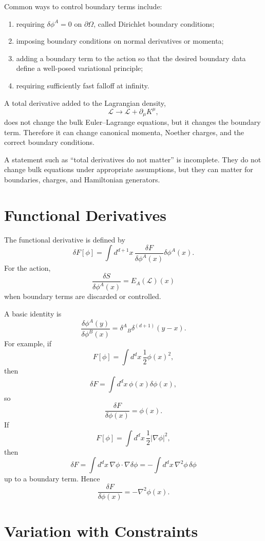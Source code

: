 Common ways to control boundary terms include:
\begin{enumerate}
    \item requiring \(\delta\phi^A=0\) on \(\partial\Omega\), called Dirichlet
    boundary conditions;
    \item imposing boundary conditions on normal derivatives or momenta;
    \item adding a boundary term to the action so that the desired boundary data
    define a well-posed variational principle;
    \item requiring sufficiently fast falloff at infinity.
\end{enumerate}

A total derivative added to the Lagrangian density,
\[
    \mathcal{L}\longrightarrow \mathcal{L}+\partial_\mu K^\mu,
\]
does not change the bulk Euler--Lagrange equations, but it changes the boundary
term. Therefore it can change canonical momenta, Noether charges, and the correct
boundary conditions.

\begin{remarkbox}
A statement such as ``total derivatives do not matter'' is incomplete. They do
not change bulk equations under appropriate assumptions, but they can matter for
boundaries, charges, and Hamiltonian generators.
\end{remarkbox}

\section{Functional Derivatives}

The functional derivative is defined by
\[
    \delta F[\phi]
    =\int d^{d+1}x\,\frac{\delta F}{\delta\phi^A(x)}\delta\phi^A(x).
\]
For the action,
\[
    \frac{\delta S}{\delta\phi^A(x)}=E_A(\mathcal{L})(x)
\]
when boundary terms are discarded or controlled.

A basic identity is
\[
    \frac{\delta\phi^A(y)}{\delta\phi^B(x)}
    =\delta^A{}_B\delta^{(d+1)}(y-x).
\]
For example, if
\[
    F[\phi]=\int d^d x\,\frac{1}{2}\phi(x)^2,
\]
then
\[
    \delta F=\int d^d x\,\phi(x)\delta\phi(x),
\]
so
\[
    \frac{\delta F}{\delta\phi(x)}=\phi(x).
\]
If
\[
    F[\phi]=\int d^d x\,\frac{1}{2}|\nabla\phi|^2,
\]
then
\[
    \delta F=\int d^d x\,\nabla\phi\cdot\nabla\delta\phi
    =-\int d^d x\,\nabla^2\phi\,\delta\phi
\]
up to a boundary term. Hence
\[
    \frac{\delta F}{\delta\phi(x)}=-\nabla^2\phi(x).
\]

\section{Variation with Constraints}

